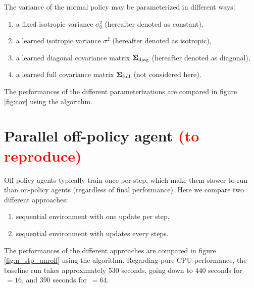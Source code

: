 The variance of the normal policy may be parameterized in different ways:

\begin{enumerate}
	\item a fixed isotropic variance $\sigma_0^2$ (hereafter denoted as constant),
	\item a learned isotropic variance $\sigma^2$ (hereafter denoted as isotropic),
	\item a learned diagonal covariance matrix $\bm{\Sigma}_\text{diag}$ (hereafter denoted as diagonal),
	\item a learned full covariance matrix $\bm{\Sigma}_\text{full}$ (not considered here).
\end{enumerate}

The performances of the different parameterizations are compared in figure \ref{fig:cov} using the \ppo algorithm.



\section{Parallel off-policy agent \textcolor{red}{(to reproduce)}}

Off-policy agents typically train once per step, which make them slower to run than on-policy agents (regardless of final performance). Here we  compare two different approaches:

\begin{enumerate}
	\item sequential environment with one update per step,
	\item sequential environment with  updates every  steps.
\end{enumerate}

The performances of the different approaches are compared in figure \ref{fig:n_stp_unroll} using the \tdt algorithm. Regarding pure CPU performance, the baseline run takes approximately $530$ seconds, going down to $440$ seconds for $\, = 16$, and $390$ seconds for $\, = 64$.



